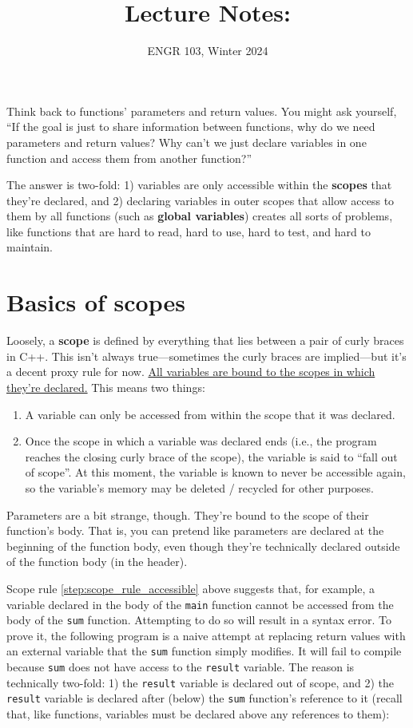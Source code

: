 \documentclass{article}
\title{
    Lecture Notes: \lecturetitle
}
\author{ENGR 103, Winter 2024}
\date{}
\begin{document}
\maketitle

Think back to functions' parameters and return values. You might ask yourself, ``If the goal is just to share information between functions, why do we need parameters and return values? Why can't we just declare variables in one function and access them from another function?''

The answer is two-fold: 1) variables are only accessible within the \textbf{scopes} that they're declared, and 2) declaring variables in outer scopes that allow access to them by all functions (such as \textbf{global variables}) creates all sorts of problems, like functions that are hard to read, hard to use, hard to test, and hard to maintain.

\section{Basics of scopes}

Loosely, a \textbf{scope} is defined by everything that lies between a pair of curly braces in C++. This isn't always true---sometimes the curly braces are implied---but it's a decent proxy rule for now. \ul{All variables are bound to the scopes in which they're declared.} This means two things:

\begin{enumerate}
    \item \label{step:scope_rule_accessible} A variable can only be accessed from within the scope that it was declared.
    \item \label{step:scope_rule_available} Once the scope in which a variable was declared ends (i.e., the program reaches the closing curly brace of the scope), the variable is said to ``fall out of scope''. At this moment, the variable is known to never be accessible again, so the variable's memory may be deleted / recycled for other purposes.
\end{enumerate}

Parameters are a bit strange, though. They're bound to the scope of their function's body. That is, you can pretend like parameters are declared at the beginning of the function body, even though they're technically declared outside of the function body (in the header).

Scope rule \ref{step:scope_rule_accessible} above suggests that, for example, a variable declared in the body of the \texttt{main} function cannot be accessed from the body of the \texttt{sum} function. Attempting to do so will result in a syntax error. To prove it, the following program is a naive attempt at replacing return values with an external variable that the \texttt{sum} function simply modifies. It will fail to compile because \texttt{sum} does not have access to the \texttt{result} variable. The reason is technically two-fold: 1) the \texttt{result} variable is declared out of scope, and 2) the \texttt{result} variable is declared after (below) the \texttt{sum} function's reference to it (recall that, like functions, variables must be declared above any references to them):
\end{document}
